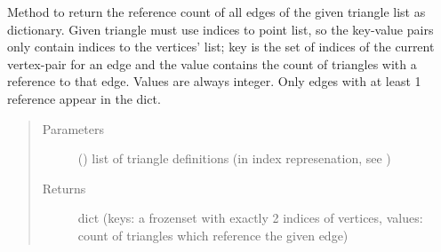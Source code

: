 \documentclass[letterpaper,10pt,english]{sphinxmanual}
\begin{document}
\begin{fulllineitems}
\label{\detokenize{pk_src.misc:pk_src.misc.getTriangleEdgesCount}}
Method to return the reference count of all  edges of the given triangle list as dictionary. Given triangle must use indices to point list, so the key-value pairs only contain indices to the vertices’ list; key is the set of indices of the current vertex-pair for an edge and the value contains the count of triangles with a reference to that edge. Values are always integer. Only edges with at least 1 reference appear in the dict.
\begin{quote}\begin{description}
\item[{Parameters}] \leavevmode
{} (\sphinxstyleliteralemphasis{{[}}\sphinxstyleliteralemphasis{{[}}\sphinxstyleliteralemphasis{, }\sphinxstyleliteralemphasis{, }\sphinxstyleliteralemphasis{{]}}\sphinxstyleliteralemphasis{, }\sphinxstyleliteralemphasis{{[}}\sphinxstyleliteralemphasis{, }\sphinxstyleliteralemphasis{, }\sphinxstyleliteralemphasis{{]}}\sphinxstyleliteralemphasis{, }\sphinxstyleliteralemphasis{{]}}) \textendash{} list of triangle definitions (in index represenation, see )

\item[{Returns}] \leavevmode
dict (keys: a frozenset with exactly 2 indices of vertices, values: count of triangles which reference the given edge)

\end{description}\end{quote}

\end{fulllineitems}

\end{document}
